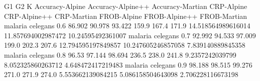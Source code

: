 G1 G2 K Accuracy-Alpine Accuracy-Alpine++ Accuracy-Martian CRP-Alpine CRP-Alpine++ CRP-Martian FROB-Alpine FROB-Alpine++ FROB-Martian
malaria celegans 0.6 86.902 90.978 93.422 159.9 167.4 171.9 14.518564989616014 11.857694002987472 10.24595492361007
malaria celegans 0.7 92.992 94.533 97.009 199.0 202.3 207.6 12.794595197849857 10.247605246857058 7.839140889845358
malaria celegans 0.8 96.53 97.144 98.694 236.5 238.0 241.8 9.2357242039799 8.052325860263712 4.648472417219483
malaria celegans 0.9 98.188 98.515 99.276 271.0 271.9 274.0 5.553662139084215 5.086158504643098 2.706228116673198
